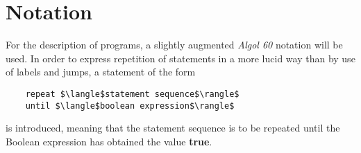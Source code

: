 \section{Notation}

For the description of programs, a slightly augmented \emph{Algol 60} notation
will be used.  In order to express repetition of statements in a more lucid way
than by use of labels and jumps, a statement of the form

\begin{lstlisting}
    repeat $\langle$statement sequence$\rangle$
    until $\langle$boolean expression$\rangle$
\end{lstlisting}

is introduced, meaning that the statement sequence is to be repeated until
the Boolean expression has obtained the value \textbf{true}.
